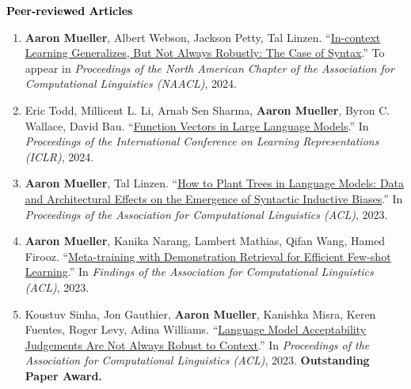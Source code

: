 \documentclass[10pt]{article}
\renewcommand{\section}[1]{\pagebreak[3]%
	\vspace{0.5\baselineskip}%
	\phantomsection\addcontentsline{toc}{section}{#1}%
	\noindent\llap{\bf\scshape\smash{\parbox[t]{\marginparwidth}{\hyphenpenalty=10000\raggedright \textcolor{black}{#1}}}}%
	\vspace{-\baselineskip}\par}
\renewcommand{\subsection}[1]{\textcolor{black}{#1}}
\providecommand*\titlelink[2]{\href{#1}{\textcolor{accent}{#2}}}
\begin{document}
	\section{Publications}

	\subsection{\textbf{Peer-reviewed Articles}}
	\begin{enumerate}[leftmargin=*, topsep=0pt, itemsep=0.25ex, partopsep=0ex, parsep=1ex]
	
	\item \textbf{Aaron Mueller}, Albert Webson, Jackson Petty, Tal Linzen. ``\titlelink{https://arxiv.org/abs/2311.07811}{In-context Learning Generalizes, But Not Always Robustly: The Case of Syntax}.'' To appear in \emph{Proceedings of the North American Chapter of the Association for Computational Linguistics (NAACL)}, 2024.\label{pub:icl-ood}
	
	\item Eric Todd, Millicent L. Li, Arnab Sen Sharma, \textbf{Aaron Mueller}, Byron C. Wallace, David Bau. ``\titlelink{https://arxiv.org/abs/2310.15213}{Function Vectors in Large Language Models}.'' In \emph{Proceedings of the International Conference on Learning Representations (ICLR)}, 2024.\label{pub:function-vectors}
	
	\item \textbf{Aaron Mueller}, Tal Linzen. ``\titlelink{https://arxiv.org/abs/2305.19905}{How to Plant Trees in Language Models: Data and Architectural Effects on the Emergence of Syntactic Inductive Biases}.'' In \emph{Proceedings of the Association for Computational Linguistics (ACL)}, 2023.
		
	\item \textbf{Aaron Mueller}, Kanika Narang, Lambert Mathias, Qifan Wang, Hamed Firooz. ``\titlelink{https://arxiv.org/abs/2307.00119}{Meta-training with Demonstration Retrieval for Efficient Few-shot Learning}.'' In \textit{Findings of the Association for Computational Linguistics (ACL)}, 2023.\label{pub:metalearn}
	
	\item Koustuv Sinha, Jon Gauthier, \textbf{Aaron Mueller}, Kanishka Misra, Keren Fuentes, Roger Levy, Adina Williams. ``\titlelink{https://arxiv.org/abs/2212.08979}{Language Model Acceptability Judgements Are Not Always Robust to Context}.'' In \emph{Proceedings of the Association for Computational Linguistics (ACL)}, 2023. \textbf{\textcolor{accent}{Outstanding Paper Award.}}
	

\end{enumerate}
\end{document}
